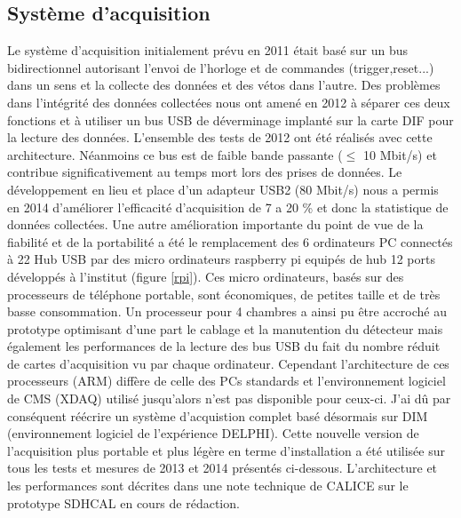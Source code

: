 \documentclass[11pt,french]{article}
\begin{document}
\subsection*{Syst\`eme d'acquisition}
Le syst\`eme d'acquisition initialement pr\'evu en 2011 \'etait bas\'e sur un bus bidirectionnel autorisant l'envoi de l'horloge et de commandes (trigger,reset...) dans un sens et la collecte des donn\'ees et des v\'etos dans l'autre. Des probl\`emes dans l'int\'egrit\'e des donn\'ees collect\'ees nous ont amen\'e en 2012 \`a s\'eparer ces deux fonctions et \`a utiliser un bus USB de d\'everminage implant\'e sur la carte DIF pour la lecture des donn\'ees. L'ensemble des tests de 2012 ont \'et\'e r\'ealis\'es avec cette architecture. N\'eanmoins ce bus est de faible bande passante ($\le$ 10 Mbit/s) et contribue significativement au temps mort lors des prises de donn\'ees. Le d\'eveloppement en lieu et place  d'un adapteur USB2 (80 Mbit/s) nous a permis en 2014 d'am\'eliorer l'efficacit\'e d'acquisition de 7 a 20 \% et donc la statistique de donn\'ees collect\'ees. Une autre am\'elioration importante du point de vue de la fiabilit\'e et de la portabilit\'e a \'et\'e le remplacement des 6 ordinateurs PC connect\'es \`a 22 Hub USB par des micro ordinateurs raspberry pi equip\'es de hub 12 ports d\'evelopp\'es \`a l'institut (figure \ref{rpi}). Ces micro ordinateurs, bas\'es sur des processeurs de t\'el\'ephone portable, sont \'economiques, de petites taille et de tr\`es basse consommation. Un processeur pour 4 chambres a ainsi pu \^etre accroch\'e au prototype optimisant d'une part le cablage et la manutention du d\'etecteur mais \'egalement les performances de la lecture des bus USB du fait du nombre r\'eduit de cartes d'acquisition vu par chaque ordinateur. Cependant l'architecture de ces processeurs (ARM) diff\`ere de celle des PCs standards et  l'environnement logiciel de CMS (XDAQ) utilis\'e jusqu'alors n'est pas disponible pour ceux-ci. J'ai d\^u par cons\'equent r\'e\'ecrire un syst\`eme d'acquistion complet bas\'e d\'esormais sur DIM (environnement logiciel de l'exp\'erience DELPHI). Cette nouvelle version de l'acquisition plus portable et plus l\'eg\`ere en terme d'installation a \'et\'e utilis\'ee sur tous les tests et mesures de 2013 et 2014 pr\'esent\'es ci-dessous. L'architecture et les performances sont d\'ecrites dans une note technique de CALICE sur le prototype SDHCAL en cours de r\'edaction.       
\end{document}
